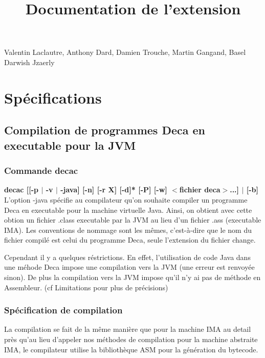 \documentclass[12pt, a4paper, one side]{article}
\title{Documentation de l'extension}
\author{}
\date{}
\begin{document}
    \maketitle

    \begin{center}
        Valentin Laclautre, Anthony Dard, Damien Trouche, Martin Gangand, Basel Darwish Jzaerly
    \end{center}

    \tableofcontents

    \section{Spécifications}
    \subsection{Compilation de programmes Deca en executable pour la JVM}
    \subsubsection{Commande decac}
    \textbf{decac [[-p $\mid$ -v $\mid$ -java] [-n] [-r X] [-d]* [-P] [-w] $<$fichier deca$>$...] $\mid$ [-b]}
    \\

    L'option -java spécifie au compilateur qu'on souhaite compiler un programme Deca en executable pour la machine virtuelle Java.
    Ainsi, on obtient avec cette obtion un fichier .class executable par la JVM au lieu d'un fichier .ass (executable IMA). Les conventions de nommage sont les mêmes, c'est-à-dire que le nom du fichier compilé est celui du programme Deca, seule l'extension du fichier change.

    Cependant il y a quelques réstrictions. En effet, l'utilisation de code Java dans une méhode Deca impose une compilation vers la JVM (une erreur est renvoyée sinon). De plus la compilation vers la JVM impose qu'il n'y ai pas de méthode en Assembleur. (cf Limitations pour plus de précisions)

    \subsubsection{Spécification de compilation}
    La compilation se fait de la même manière que pour la machine IMA au detail près qu'au lieu d'appeler nos méthodes de compilation pour la machine abstraite IMA, le compilateur utilise la bibliothèque ASM\cite{ASM} pour la génération du bytecode.
\end{document}
